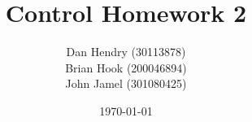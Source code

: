 \documentclass[12pt]{enscStyle}
\title{Control Homework 2}
\date{\today}
\author{
	Dan Hendry (30113878) \\
	Brian Hook (200046894) \\ 
	John Jamel (301080425)
}
\begin{document}

\maketitle

















%


\begin{appendix}
\onecolumn

\end{appendix}
\end{document}
